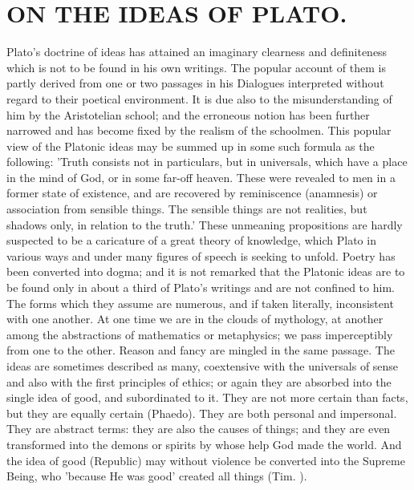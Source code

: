 \documentclass[11pt,letter]{article}
\begin{document}
\section{
      ON THE IDEAS OF PLATO.
    }
\par  Plato's doctrine of ideas has attained an imaginary clearness and definiteness which is not to be found in his own writings. The popular account of them is partly derived from one or two passages in his Dialogues interpreted without regard to their poetical environment. It is due also to the misunderstanding of him by the Aristotelian school; and the erroneous notion has been further narrowed and has become fixed by the realism of the schoolmen. This popular view of the Platonic ideas may be summed up in some such formula as the following: 'Truth consists not in particulars, but in universals, which have a place in the mind of God, or in some far-off heaven. These were revealed to men in a former state of existence, and are recovered by reminiscence (anamnesis) or association from sensible things. The sensible things are not realities, but shadows only, in relation to the truth.' These unmeaning propositions are hardly suspected to be a caricature of a great theory of knowledge, which Plato in various ways and under many figures of speech is seeking to unfold. Poetry has been converted into dogma; and it is not remarked that the Platonic ideas are to be found only in about a third of Plato's writings and are not confined to him. The forms which they assume are numerous, and if taken literally, inconsistent with one another. At one time we are in the clouds of mythology, at another among the abstractions of mathematics or metaphysics; we pass imperceptibly from one to the other. Reason and fancy are mingled in the same passage. The ideas are sometimes described as many, coextensive with the universals of sense and also with the first principles of ethics; or again they are absorbed into the single idea of good, and subordinated to it. They are not more certain than facts, but they are equally certain (Phaedo). They are both personal and impersonal. They are abstract terms: they are also the causes of things; and they are even transformed into the demons or spirits by whose help God made the world. And the idea of good (Republic) may without violence be converted into the Supreme Being, who 'because He was good' created all things (Tim. ).
\end{document}

